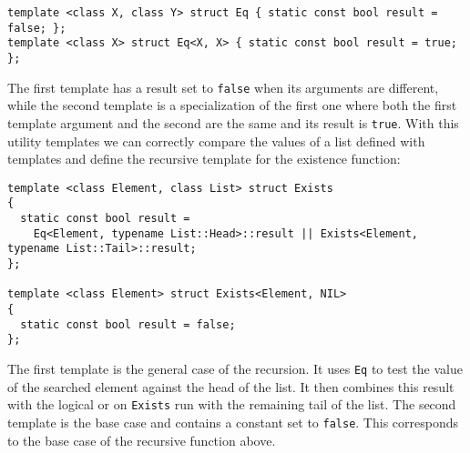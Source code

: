 \begin{lstlisting}
template <class X, class Y> struct Eq { static const bool result = false; };
template <class X> struct Eq<X, X> { static const bool result = true; };
\end{lstlisting}

\noindent
The first template has a result set to \texttt{false} when its arguments are different, while the second template is a specialization of the first one where both the first template argument and the second are the same and its result is \texttt{true}. With this utility templates we can correctly compare the values of a list defined with templates and define the recursive template for the existence function:

\begin{lstlisting}
template <class Element, class List> struct Exists
{
  static const bool result = 
    Eq<Element, typename List::Head>::result || Exists<Element, typename List::Tail>::result;
};

template <class Element> struct Exists<Element, NIL>
{
  static const bool result = false;
};
\end{lstlisting}

\noindent
The first template is the general case of the recursion. It uses \texttt{Eq} to test the value of the searched element against the head of the list. It then combines this result with the logical or on \texttt{Exists} run with the remaining tail of the list. The second template is the base case and contains a constant set to \texttt{false}. This corresponds to the base case of the recursive function above.